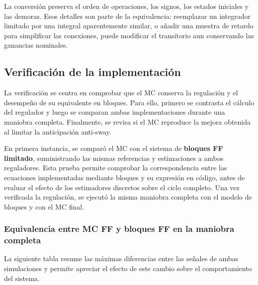\documentclass[a4paper,10pt,onecolumn,journal]{ieeeconf}
\numberwithin{equation}{section}
\begin{document}
La conversión preserva el orden de operaciones, los signos, los estados iniciales y las demoras. Esos detalles son parte de la equivalencia: reemplazar un integrador limitado por una integral aparentemente similar, o añadir una muestra de retardo para simplificar las conexiones, puede modificar el transitorio aun conservando las ganancias nominales.


\subsection{Verificación de la implementación}

La verificación se centra en comprobar que el MC conserva la regulación y el desempeño de su equivalente en bloques. Para ello, primero se contrasta el cálculo del regulador y luego se comparan ambas implementaciones durante una maniobra completa. Finalmente, se revisa si el MC reproduce la mejora obtenida al limitar la anticipación anti-sway.

En primera instancia, se comparó el MC con el sistema de \textbf{bloques FF limitado}, suministrando las mismas referencias y estimaciones a ambos reguladores. Esta prueba permite comprobar la correspondencia entre las ecuaciones implementadas mediante bloques y su expresión en código, antes de evaluar el efecto de los estimadores discretos sobre el ciclo completo. Una vez verificada la regulación, se ejecutó la misma maniobra completa con el modelo de bloques y con el MC final.


\FloatBarrier
{}
\subsubsection{Equivalencia entre MC FF y bloques FF en la maniobra completa}

La siguiente tabla resume las máximas diferencias entre las señales de ambas simulaciones y permite apreciar el efecto de este cambio sobre el comportamiento del sistema.
\end{document}
